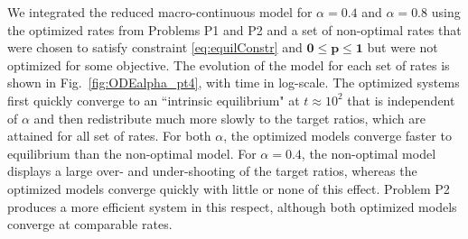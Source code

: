 

We integrated the reduced macro-continuous model for $\alpha=0.4$
and $\alpha=0.8$ using the optimized rates from Problems P1 and P2
and a set of non-optimal rates that were chosen to satisfy
constraint \eqref{eq:equilConstr} and $\mathbf{0} \leq \mathbf{p}
\leq \mathbf{1}$ but were not optimized for some objective.  The
evolution of the model for each set of rates is shown in
Fig.~\ref{fig:ODEalpha_pt4}, with time in log-scale.  The optimized
systems first quickly converge to an ``intrinsic equilibrium" at $t
\approx 10^2$ that is independent of $\alpha$ and then redistribute
much more slowly to the target ratios, which are attained for all
set of rates.  For both $\alpha$, the optimized models converge
faster to equilibrium than the non-optimal model. For $\alpha=0.4$,
the non-optimal model displays a large over- and under-shooting of
the target ratios, whereas the optimized models converge quickly
with little or none of this effect.  Problem P2 produces a more
efficient system in this respect, although both optimized models
converge at comparable rates.





